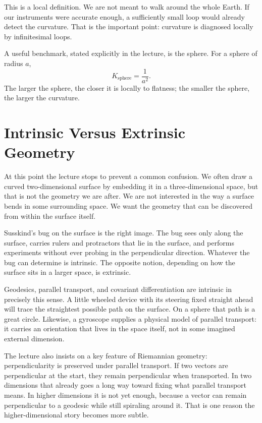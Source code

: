 This is a local definition. We are not meant to walk around the whole Earth. If our instruments were accurate enough, a sufficiently small loop would already detect the curvature. That is the important point: curvature is diagnosed locally by infinitesimal loops.

A useful benchmark, stated explicitly in the lecture, is the sphere. For a sphere of radius \(a\),
\begin{equation}
K_{\text{sphere}}=\frac{1}{a^2}.
\end{equation}
The larger the sphere, the closer it is locally to flatness; the smaller the sphere, the larger the curvature.

\section{Intrinsic Versus Extrinsic Geometry}

At this point the lecture stops to prevent a common confusion. We often draw a curved two-dimensional surface by embedding it in a three-dimensional space, but that is not the geometry we are after. We are not interested in the way a surface bends in some surrounding space. We want the geometry that can be discovered from within the surface itself.

Susskind's bug on the surface is the right image. The bug sees only along the surface, carries rulers and protractors that lie in the surface, and performs experiments without ever probing in the perpendicular direction. Whatever the bug can determine is intrinsic. The opposite notion, depending on how the surface sits in a larger space, is extrinsic.

Geodesics, parallel transport, and covariant differentiation are intrinsic in precisely this sense. A little wheeled device with its steering fixed straight ahead will trace the straightest possible path on the surface. On a sphere that path is a great circle. Likewise, a gyroscope supplies a physical model of parallel transport: it carries an orientation that lives in the space itself, not in some imagined external dimension.

The lecture also insists on a key feature of Riemannian geometry: perpendicularity is preserved under parallel transport. If two vectors are perpendicular at the start, they remain perpendicular when transported. In two dimensions that already goes a long way toward fixing what parallel transport means. In higher dimensions it is not yet enough, because a vector can remain perpendicular to a geodesic while still spiraling around it. That is one reason the higher-dimensional story becomes more subtle.

